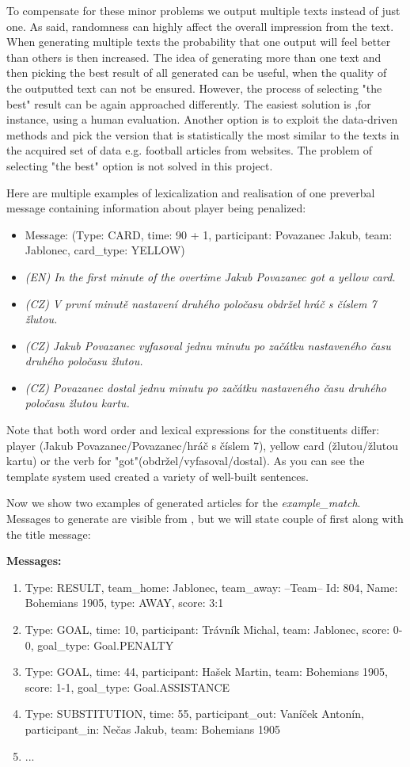 To compensate for these minor problems we output multiple texts instead of just one. As said, randomness can highly affect the overall impression from the text. When generating multiple texts the probability that one output will feel better than others is then increased. The idea of generating more than one text and then picking the best result of all generated can be useful, when the quality of the outputted text can not be ensured. However, the process of selecting "the best" result can be again approached differently. The easiest solution is ,for instance, using a human evaluation. Another option is to exploit the data-driven methods and pick the version that is statistically the most similar to the texts in the acquired set of data e.g. football articles from websites. The problem of selecting "the best" option is not solved in this project. 

Here are multiple examples of lexicalization and realisation of one preverbal message containing information about player being penalized:
\begin{itemize}
	\item Message: (Type: CARD, time: 90 + 1, participant: Povazanec Jakub, team: Jablonec, card\_type: YELLOW)
	\item \textit{(EN) In the first minute of the overtime Jakub Povazanec got a yellow card.}
	\item \textit{(CZ) V první minutě nastavení druhého poločasu obdržel hráč s číslem 7 žlutou.}
	\item \textit{(CZ) Jakub Povazanec vyfasoval jednu minutu po začátku nastaveného času druhého poločasu žlutou.}
	\item \textit{(CZ) Povazanec dostal jednu minutu po začátku nastaveného času druhého poločasu žlutou kartu.}
\end{itemize}
Note that both word order and lexical expressions for the constituents differ: player (Jakub Povazanec/Povazanec/hráč s číslem 7), yellow card (žlutou/žlutou kartu) or the verb for "got"(obdržel/vyfasoval/dostal). As you can see the template system used created a variety of well-built sentences.

Now we show two examples of generated articles for the \textit{example\_match}. Messages to generate are visible from , but we will state couple of first along with the title message:

\noindent\makebox[\linewidth]{\rule{\textwidth}{0.4pt}}
\textbf{Messages:}
\begin{enumerate}
	\item Type: RESULT, team\_home: Jablonec, team\_away: --Team-- Id: 804, Name: Bohemians 1905, type: AWAY, score: 3:1
	\item Type: GOAL, time: 10, participant: Trávník Michal, team: Jablonec, score: 0-0, goal\_type: Goal.PENALTY
	\item Type: GOAL, time: 44, participant: Hašek Martin, team: Bohemians 1905, score: 1-1, goal\_type: Goal.ASSISTANCE
	\item Type: SUBSTITUTION, time: 55, participant\_out: Vaníček Antonín, participant\_in: Nečas Jakub, team: Bohemians 1905
	\item ...
\end{enumerate}

